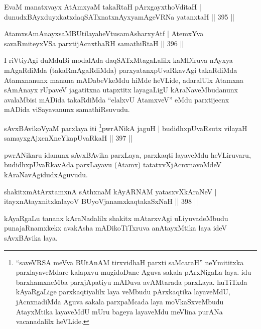 
\begin{shl}
EvaM manatxvayx AtAmx\s yaM takaRtaH pArxgayxthoVditaH |
dunudxBAyxduyxkatxdaqSATxnatxnAyxyamAgeVRNa yatanxtaH \hfill || 395 ||
\end{shl}
\begin{shl}
AtamxsAmAnayxsaMBUtilayaheVtusamAsharxyAtf |
AtemxYva savaRmiteyxVSa parxtijAcnxthaRH samathiRtaH \hfill || 396 ||
\end{shl}

\begin{artha}
I riVtiyAgi duMduBi modalAda daqSATxMtagaLalilx kaMDiruva nAyxya mAgaRdiMda (takaRmAgaRdiMda) parxyatanxpUvaRkavAgi takaRdiMda Atamxnanunx manana mADabeVkeMdu hiMde heVLide, adaralUlx Atamxna sAmAnayx rUpaveV jagatitxna utapxtitx layagaLigU kAraNaveMbudanunx avalaMbisi mADida takaRdiMda ``elalxvU AtamxveV'' eMdu parxtijecnx mADida viSayavanunx samathiRsuvudu.
\end{artha}

\begin{shl}
sAvxBAvikoV\s yaM parxlaya iti \footnote{``saveVRSA meVva BUtAnAM tirxvidhaH parxti saMcaraH'' neYmititxka parxlayaveMdare kalapxvu mugidoDane Aguva sakala pArxNigaLa laya. idu barxhamxneMba parxjApatiyu mADuva avAMtarada parxLaya. huTiTxda kAyaRgaLige parxkaqtiyalilx laya veMbudu pArxkaqtika layaveMdU, jAcnxnadiMda Aguva sakala parxpaMcada laya moVkaSxveMbudu AtayxMtika layaveMdU mUru bageya layaveMdu meVlina purANa vacanadalilx heVLide.}pwrANikA jaguH |
budidhxpUvaRsutx vilayaH samayxgAjxcnXneYkapUvaRkaH \hfill || 397 ||
\end{shl}

\begin{artha}
pwrANikaru idanunx sAvxBAvika parxLaya, parxkaqti layaveMdu heVLiruvaru, budidhxpUvaRkavAda parxLayavu (Atamx) tatatxvXjAcnxnavoMdeV kAraNavAgidudx\break Aguvudu.
\end{artha}


\begin{shl}
shakitxmAtArxtamxnA sAthxnaM kAyARNAM yatasxvXkAraNeV |
itayxnAtayxnitxkalayoV BUyoVjanamxkaqtakaSxNaH \hfill || 398 ||
\end{shl}

\begin{artha}
kAyaRgaLu tananx kAraNadalilx shakitx mAtarxvAgi uLiyuvadeMbudu punajaRnamxkekx avakAsha mADikoTiTxruva anAtayxMtika laya ideV sAvxBAvika laya.
\end{artha}

